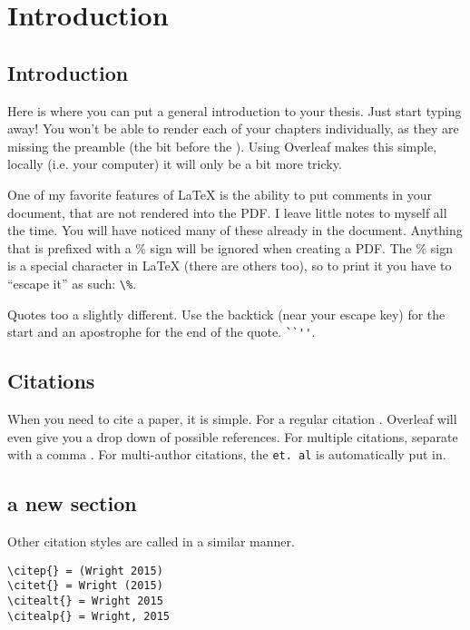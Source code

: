 
\chapter{Introduction} %

\label{Introduction} %

\section{Introduction}

Here is where you can put a general introduction to your thesis. Just start typing away! You won't be able to render each of your chapters individually, as they are missing the preamble (the bit before the \verb++). Using Overleaf makes this simple, locally (i.e. your computer) it will only be a bit more tricky. 

One of my favorite features of \LaTeX{} is the ability to put comments in your document, that are not rendered into the PDF. I leave little notes to myself all the time. You will have noticed many of these already in the document. Anything that is prefixed with a \% sign will be ignored when creating a PDF. The \% sign is a special character in \LaTeX{} (there are others too), so to print it you have to ``escape it'' as such: \verb+\%+.

Quotes too a slightly different. Use the backtick (near your escape key) for the start and an apostrophe for the end of the quote. \verb+``''+. 

\section{Citations}
When you need to cite a paper, it is simple. For a regular citation \citep{wright1932roles}. Overleaf will even give you a drop down of possible references. For multiple citations, separate with a comma \citep{wright1932roles,haldane1922sex}. For multi-author citations, the \verb+et. al+ is automatically put in.

\section{a new section}

Other citation styles are called in a similar manner.
\begin{verbatim}
\citep{} = (Wright 2015)
\citet{} = Wright (2015)
\citealt{} = Wright 2015
\citealp{} = Wright, 2015
\end{verbatim}

